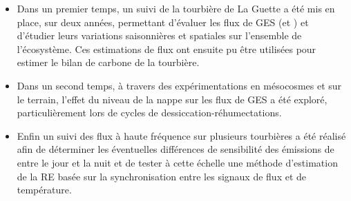 %
\begin{itemize}
\item Dans un premier temps, un suivi de la tourbière de La Guette a été mis en place, sur deux années, permettant d'évaluer les flux de GES (\coo et \chh) et d'étudier leurs variations saisonnières et spatiales sur l'ensemble de l'écosystème. Ces estimations de flux ont ensuite pu être utilisées pour estimer le bilan de carbone de la tourbière.
\item Dans un second temps, à travers des expérimentations en mésocosmes et sur le terrain, l'effet du niveau de la nappe sur les flux de GES a été exploré, particulièrement lors de cycles de dessiccation-réhumectations.
\item Enfin un suivi des flux à haute fréquence sur plusieurs tourbières a été réalisé afin de déterminer les éventuelles différences de sensibilité des émissions de \coo entre le jour et la nuit et de tester à cette échelle une méthode d'estimation de la RE basée sur la synchronisation entre les signaux de flux et de température.
\end{itemize}







